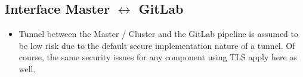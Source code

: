 \subsection{Interface Master \(\leftrightarrow\) GitLab}
\begin{itemize}
    \item Tunnel between the Master / Cluster and the GitLab pipeline is assumed to be low risk due to the default secure implementation nature of a tunnel. Of course, the same security issues for any component using TLS apply here as well.
\end{itemize}

